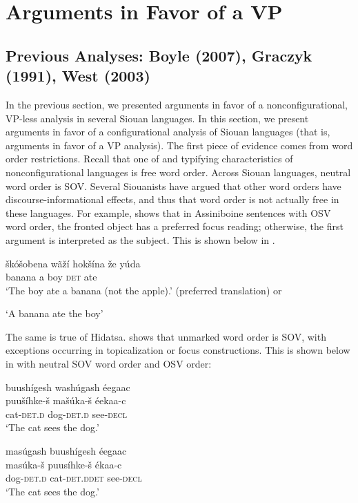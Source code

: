 \documentclass[output=paper]{LSP/langsci}
\begin{document}
\section{Arguments in Favor of a VP}\label{sec:jrs:3}

\subsection{Previous Analyses: Boyle (2007), Graczyk (1991), West (2003)}

In the previous section, we presented arguments in favor of a nonconfigurational, VP-less analysis in several Siouan languages.  In this section, we present arguments in favor of a configurational analysis of Siouan languages (that is, arguments in favor of a VP analysis).  The first piece of evidence comes from word order restrictions. Recall that one of  and  typifying characteristics of nonconfigurational languages is free word order.  Across Siouan languages, neutral word order is SOV.  Several Siouanists have argued that other word orders have discourse-informational effects, and thus that word order is not actually free in these languages. For example, \citet{West2003} shows that in Assiniboine sentences with OSV word order, the fronted object has a preferred focus reading; otherwise, the first argument is interpreted as the subject. This is shown below in . 

\begin{exe}
\ex\label{ex:jrs:22}	\gll  \v{s}k\'o\v{s}obena w\~a\v{z}\'i 	hok\v{s}\'ina 	\v{z}e 		y\'uda \\
banana 		a 			boy 	\textsc{det} 	ate \\
\trans `The boy ate a banana (not the apple).' (preferred translation) or 

`A banana ate the boy'  \citep[49]{West2003} 
\end{exe}

The same is true of Hidatsa.  \citet{Boyle2007} shows that unmarked word order is SOV, with exceptions occurring in topicalization or focus constructions.  This is shown below in  with neutral SOV word order and  OSV order:

\begin{exe}
\ex\label{ex:jrs:23} 
\glll buush\'igesh wash\'ugash \'eegaac\\
puu\v{s}\'ihke-\v{s}  ma\v{s}\'uka-\v{s} \'eekaa-c \\
cat-\textsc{det.d} dog-\textsc{det.d} see-\textsc{decl}  \\
\trans `The cat sees the dog.'  \citep[214]{Boyle2007}

\ex\label{ex:jrs:24} 
\glll mas\'ugash 		buush\'igesh 	\'eegaac\\
mas\'uka-\v{s} 		puus\'ihke-\v{s} 	\'ekaa-c \\
dog-\textsc{det.d} 		cat-\textsc{det.d}\textsc{det}	see-\textsc{decl} \\
\trans `The cat sees the dog.' \citep[214]{Boyle2007}

\end{exe}
	
\end{document}
